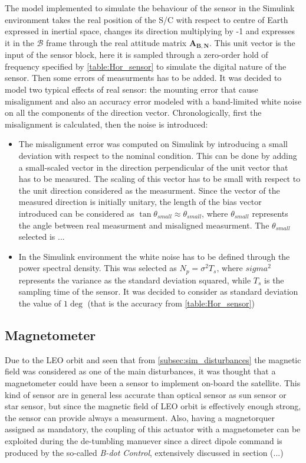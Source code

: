 The model implemented to simulate the behaviour of the sensor in the Simulink environment takes the real position of the S/C with respect to centre of Earth expressed in inertial space, changes its direction multiplying by -1 and expresses it in the $\mathcal{B}$ frame through the real attitude matrix $\boldsymbol{A_{B,N}}$. 
This unit vector is the input of the sensor block, here it is sampled through a zero-order hold of frequency specified by
\autoref{table:Hor_sensor} to simulate the digital nature of the sensor. Then some errors of measurments has to be added.
It was decided to model two typical effects of real sensor: the mounting error that cause misalignment and also an 
accuracy error modeled with a band-limited white noise on all the components of the direction vector.
Chronologically, first the misalignment is calculated, then the noise is introduced:
\begin{itemize}
    \item The misalignment error was computed on Simulink by introducing a small deviation with respect to the nominal condition. This can
    be done by adding a small-scaled vector in the direction perpendicular of the unit vector that has to be measured. The scaling of 
    this vector has to be small with respect to the unit direction considered as the measurment. Since the vector of the measured 
    direction is initially unitary, the length of the bias vector introduced can be considered as $\tan{\theta_{small}} \approx \theta_{small}$,
    where $\theta_{small}$ represents the angle between real measurment and misaligned measurment. The $\theta_{small}$ selected is ... 
    \item In the Simulink environment the white noise has to be defined through the power spectral density. This was selected as $N_p = \sigma^2 {T_s} $, 
    where $sigma^2$ represents the variance as the standard deviation squared, while $T_s$ is the sampling time of the sensor.
    It was decided to consider as standard deviation the value of $1\deg$ (that is the accuracy from \autoref{table:Hor_sensor})
\end{itemize}


\subsection{Magnetometer}
Due to the LEO orbit and seen that from \autoref{subsec:sim_disturbances} the magnetic field  was considered as one of the main disturbances, 
it was thought that a magnetometer could have been a sensor to implement on-board the satellite. This kind of sensor are in general less accurate 
than optical sensor as sun sensor or star sensor, but since the magnetic field of LEO orbit is effectively enough strong, the sensor can provide 
always a measurment. Also, having a magnetorquer assigned as mandatory, the coupling of this actuator with a magnetometer can be exploited during 
the de-tumbling manuever since a direct dipole command is produced by the so-called \textit{B-dot Control}, extensively discussed in section (...)


